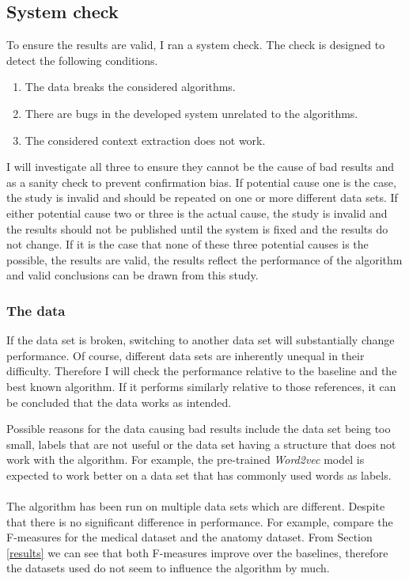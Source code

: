 \documentclass{article}
\begin{document}
 
 \subsection{System check}
 To ensure the results are valid, I ran a system check. The check is designed to detect the following conditions.
  \begin{enumerate}
  \item The data breaks the considered algorithms.
  \item There are bugs in the developed system unrelated to the algorithms.
  \item The considered context extraction does not work.
  \end{enumerate}
  
  I will investigate all three to ensure they cannot be the cause of bad results and as a sanity check to prevent confirmation bias.
  If potential cause one is the case, the study is invalid and should be repeated on one or more different data sets. If either potential cause two or three is the actual cause, the study is invalid and the results should not be published until the system is fixed and the results do not change. If it is the case that none of these three potential causes is the possible, the results are valid, the results reflect the performance of the algorithm and valid conclusions can be drawn from this study.
  
  \subsubsection{The data}
  If the data set is broken, switching to another data set will substantially change performance. Of course, different data sets are inherently unequal in their difficulty. Therefore I will check the performance relative to the baseline and the best known algorithm. If it performs similarly relative to those references, it can be concluded that the data works as intended.

  Possible reasons for the data causing bad results include the data set being too small, labels that are not useful or the data set having a structure that does not work with the algorithm. For example, the pre-trained \emph{Word2vec} model is expected to work better on a data set that has commonly used words as labels. %
  \paragraph{}
 The algorithm has been run on multiple data sets which are different. Despite that there is no significant difference in performance. For example, compare the F-measures for the medical dataset and the anatomy dataset. From Section \ref{results} we can see that both F-measures improve over the baselines, therefore the datasets used do not seem to influence the algorithm by much.
\end{document}
